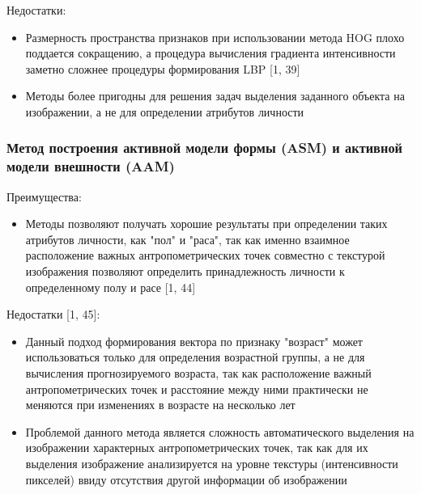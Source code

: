 \documentclass[12pt,a4paper]{article}
\begin{document}
Недостатки:
\begin{itemize}
    \item Размерность пространства признаков при использовании метода HOG плохо поддается сокращению, а процедура вычисления градиента интенсивности заметно сложнее процедуры формирования LBP [1, 39]
    \item Методы более пригодны для решения задач выделения заданного объекта на изображении, а не для определении атрибутов личности
\end{itemize}

\subsubsection{Метод построения активной модели формы (ASM) и активной модели внешности (AAM)}
Преимущества:
\begin{itemize}
    \item Методы позволяют получать хорошие результаты при определении таких атрибутов личности, как "пол" и "раса", так как именно взаимное расположение важных антропометрических точек совместно с текстурой изображения позволяют определить принадлежность личности к определенному полу и расе [1, 44]
\end{itemize}

Недостатки [1, 45]:
\begin{itemize}
    \item Данный подход формирования вектора по признаку "возраст" может использоваться только для определения возрастной группы, а не для вычисления прогнозируемого возраста, так как расположение важный антропометрических точек и расстояние между ними практически не меняются при изменениях в возрасте на несколько лет
    \item Проблемой данного метода является сложность автоматического выделения на изображении характерных антропометрических точек, так как для их выделения изображение анализируется на уровне текстуры (интенсивности пикселей) ввиду отсутствия другой информации об изображении
\end{itemize}
\end{document}
